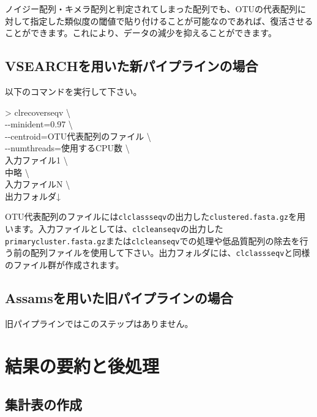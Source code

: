 \documentclass[titlepage,10pt,a4paper]{jsbook}
\newenvironment{cmd}{\begin{oframed}\raggedright\ttfamily\footnotesize\setlength{\baselineskip}{1.4em}}{\end{oframed}\vspace{-1em}}
\begin{document}
ノイジー配列・キメラ配列と判定されてしまった配列でも、OTUの代表配列に対して指定した類似度の閾値で貼り付けることが可能なのであれば、復活させることができます。これにより、データの減少を抑えることができます。

\subsection{VSEARCHを用いた新パイプラインの場合}

以下のコマンドを実行して下さい。
\begin{cmd}
{\textgreater} clrecoverseqv {\textbackslash}\\
{-}{-}minident=0.97 {\textbackslash}\\
{-}{-}centroid=OTU代表配列のファイル {\textbackslash}\\
{-}{-}numthreads=使用するCPU数 {\textbackslash}\\
入力ファイル1 {\textbackslash}\\
中略 {\textbackslash}\\
入力ファイルN {\textbackslash}\\
出力フォルダ↓
\end{cmd}
OTU代表配列のファイルには\texttt{clclassseqv}の出力した\texttt{clustered.fasta.gz}を用います。入力ファイルとしては、\texttt{clcleanseqv}の出力した\texttt{primarycluster.fasta.gz}または\texttt{clcleanseqv}での処理や低品質配列の除去を行う前の配列ファイルを使用して下さい。出力フォルダには、\texttt{clclassseqv}と同様のファイル群が作成されます。

\subsection{Assamsを用いた旧パイプラインの場合}

旧パイプラインではこのステップはありません。

\section{結果の要約と後処理}

\subsection{集計表の作成}\label{subsection:makesummarytable}
\end{document}
